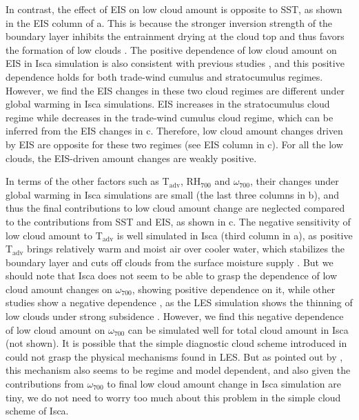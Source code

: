 In contrast, the effect of EIS on low cloud amount is opposite to SST, as shown in the EIS column of a. This is because the stronger inversion strength of the boundary layer inhibits the entrainment drying at the cloud top and thus favors the formation of low clouds \cite[e.g.,][]{Bretherton2015,Scott2020}. The positive dependence of low cloud amount on EIS in Isca simulation is also consistent with previous studies \citep{Qu2015positive,Myers2021,Cesana2021}, and this positive dependence holds for both trade-wind cumulus and stratocumulus regimes. However, we find the EIS changes in these two cloud regimes are different under global warming in Isca simulations. EIS increases in the stratocumulus cloud regime while decreases in the trade-wind cumulus cloud regime, which can be inferred from the EIS changes in c. Therefore, low cloud amount changes driven by EIS are opposite for these two regimes (see EIS column in c). For all the low clouds, the EIS-driven amount changes are weakly positive.

In terms of the other factors such as T$_{\mathrm{adv}}$, RH$_{700}$ and $\omega_{700}$, their changes under global warming in Isca simulations are small (the last three columns in b), and thus the final contributions to low cloud amount change are neglected compared to the contributions from SST and EIS, as shown in c. The negative sensitivity of low cloud amount to T$_{\mathrm{adv}}$ is well simulated in Isca (third column in a), as positive T$_{\mathrm{adv}}$ brings relatively warm and moist air over cooler water, which stabilizes the boundary layer and cuts off clouds from the surface moisture supply \citep{Scott2020}. But we should note that Isca does not seem to be able to grasp the dependence of low cloud amount changes on $\omega_{700}$, showing positive dependence on it, while other studies show a negative dependence \citep[e.g.,][]{Scott2020,Zelinka2020causes}, as the LES simulation shows the thinning of low clouds under strong subsidence \citep{Bretherton2015}. However, we find this negative dependence of low cloud amount on $\omega_{700}$ can be simulated well for total cloud amount in Isca (not shown). It is possible that the simple diagnostic cloud scheme introduced in  could not grasp the physical mechanisms found in LES. But as pointed out by \cite{McCoy2017change}, this mechanism also seems to be regime and model dependent, and also given the contributions from $\omega_{700}$ to final low cloud amount change in Isca simulation are tiny, we do not need to worry too much about this problem in the simple cloud scheme of Isca.


